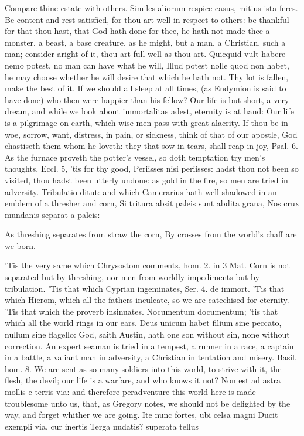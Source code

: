 {Compare thine estate with others. Similes aliorum respice casus, mitius
ista feres. Be content and rest satisfied, for thou art well in respect
to others: be thankful for that thou hast, that God hath done for thee,
he hath not made thee a monster, a beast, a base creature, as he might,
but a man, a Christian, such a man; consider aright of it, thou art
full well as thou art. Quicquid vult habere nemo potest, no man
can have what he will, Illud potest nolle quod non habet, he may choose
whether he will desire that which he hath not. Thy lot is fallen, make
the best of it. If we should all sleep at all times, (as Endymion
is said to have done) who then were happier than his fellow? Our life
is but short, a very dream, and while we look about immortalitas
adest, eternity is at hand: Our life is a pilgrimage on earth,
which wise men pass with great alacrity. If thou be in woe, sorrow,
want, distress, in pain, or sickness, think of that of our apostle, God
chastiseth them whom he loveth: they that sow in tears, shall reap in
joy, Psal.  6. As the furnace proveth the potter's vessel, so
doth temptation try men's thoughts, Eccl.  5, 'tis for thy
good, Periisses nisi periisses: hadst thou not been so visited, thou
hadst been utterly undone: as gold in the fire, so men are tried in
adversity. Tribulatio ditut: and which Camerarius hath well shadowed in
an emblem of a thresher and corn,
Si tritura absit paleis sunt abdita grana,
Nos crux mundanis separat a paleis:

As threshing separates from straw the corn,
By crosses from the world's chaff are we born.

'Tis the very same which Chrysostom comments, hom. 2. in 3 Mat.
Corn is not separated but by threshing, nor men from worldly
impediments but by tribulation. 'Tis that which Cyprian
ingeminates, Ser. 4. de immort. 'Tis that which Hierom, which all
the fathers inculcate, so we are catechised for eternity. 'Tis that
which the proverb insinuates. Nocumentum documentum; 'tis that which
all the world rings in our ears. Deus unicum habet filium sine peccato,
nullum sine flagello: God, saith Austin, hath one son without
sin, none without correction. An expert seaman is tried in a
tempest, a runner in a race, a captain in a battle, a valiant man in
adversity, a Christian in tentation and misery. Basil, hom. 8. We are
sent as so many soldiers into this world, to strive with it, the flesh,
the devil; our life is a warfare, and who knows it not? Non est
ad astra mollis e terris via: and therefore peradventure this
world here is made troublesome unto us, that, as Gregory notes, we
should not be delighted by the way, and forget whither we are going.
Ite nunc fortes, ubi celsa magni
Ducit exempli via, cur inertis
Terga nudatis? superata tellus

}
